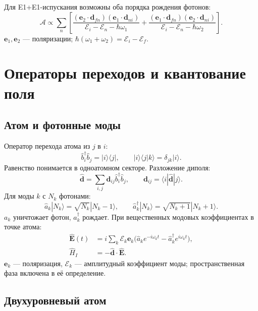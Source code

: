 \documentclass[../final.tex]{subfiles}
\begin{document}
Для E1+E1-испускания возможны оба порядка рождения фотонов:
\begin{equation*}
    \mathcal A\propto\sum_n\left[
      \frac{(\mathbf e_2\cdot\mathbf d_{fn})(\mathbf e_1\cdot\mathbf d_{ni})}
           {\mathcal E_i-\mathcal E_n-\hbar\omega_1}
      +\frac{(\mathbf e_1\cdot\mathbf d_{fn})(\mathbf e_2\cdot\mathbf d_{ni})}
           {\mathcal E_i-\mathcal E_n-\hbar\omega_2}
    \right].
\end{equation*}
\(\mathbf e_1,\mathbf e_2\) --- поляризации;
\(\hbar(\omega_1+\omega_2)=\mathcal E_i-\mathcal E_f\).

\section{Операторы переходов и квантование поля}

\subsection{Атом и фотонные моды}

Оператор перехода атома из \(j\) в \(i\):
\begin{equation*}
    \hat b_i^\dagger\hat b_j=|i\rangle\langle j|,\qquad
    |i\rangle\langle j|k\rangle=\delta_{jk}|i\rangle.
\end{equation*}
Равенство понимается в одноатомном секторе. Разложение диполя:
\begin{equation*}
    \hat{\mathbf d}=\sum_{i,j}\mathbf d_{ij}\hat b_i^\dagger\hat b_j,
    \qquad \mathbf d_{ij}=\langle i|\hat{\mathbf d}|j\rangle.
\end{equation*}
Для моды \(k\) с \(N_k\) фотонами:
\begin{equation*}
    \hat a_k|N_k\rangle=\sqrt{N_k}|N_k-1\rangle,\qquad
    \hat a_k^\dagger|N_k\rangle=\sqrt{N_k+1}|N_k+1\rangle.
\end{equation*}
\(a_k\) уничтожает фотон, \(a_k^\dagger\) рождает.
При вещественных модовых коэффициентах в точке атома:
\begin{align*}
    \hat{\mathbf E}(t)
      &=i\sum_k\mathcal E_k\mathbf e_k
        \bigl(\hat a_ke^{-i\omega_kt}-\hat a_k^\dagger e^{i\omega_kt}\bigr),\\
    \hat H_I&=-\hat{\mathbf d}\cdot\hat{\mathbf E}.
\end{align*}
\(\mathbf e_k\) --- поляризация, \(\mathcal E_k\) --- амплитудный
коэффициент моды; пространственная фаза включена в её определение.

\subsection{Двухуровневый атом}
\end{document}

